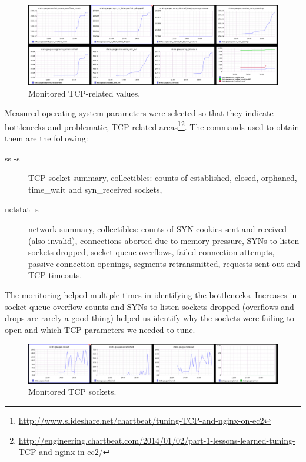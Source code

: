 \documentclass{uvamscse}
\begin{document}
\begin{figure}[H]
\centering
\includegraphics[scale=0.4]{graphiteTCP}
\caption{Monitored TCP-related values.}
\label{figure:TCPstates}
\end{figure}

Measured operating system parameters were selected so that they indicate bottlenecks and problematic, TCP-related areas\footnote{\url{http://www.slideshare.net/chartbeat/tuning-TCP-and-nginx-on-ec2}}\footnote{\url{http://engineering.chartbeat.com/2014/01/02/part-1-lessons-learned-tuning-TCP-and-nginx-in-ec2/}}. The commands used to obtain them are the following:
\begin{description}
  \item [ss -s] TCP socket summary, collectibles: counts of established, closed, orphaned, time\_wait and syn\_received sockets,
  \item [netstat -s] network summary, collectibles: counts of SYN cookies sent and received (also invalid), connections aborted due to memory pressure, SYNs to listen sockets dropped, socket queue overflows, failed connection attempts, passive connection openings, segments retransmitted, requests sent out and TCP timeouts.
\end{description}

The monitoring helped multiple times in identifying the bottlenecks. Increases in socket queue overflow counts and SYNs to listen sockets dropped (overflows and drops are rarely a good thing) helped us identify why the sockets were failing to open and which TCP parameters we needed to tune.

\begin{figure}[H]
\centering
\includegraphics[scale=0.4]{graphitesocket}
\caption{Monitored TCP sockets.}
\label{figure:TCPstates}
\end{figure}
\end{document}
